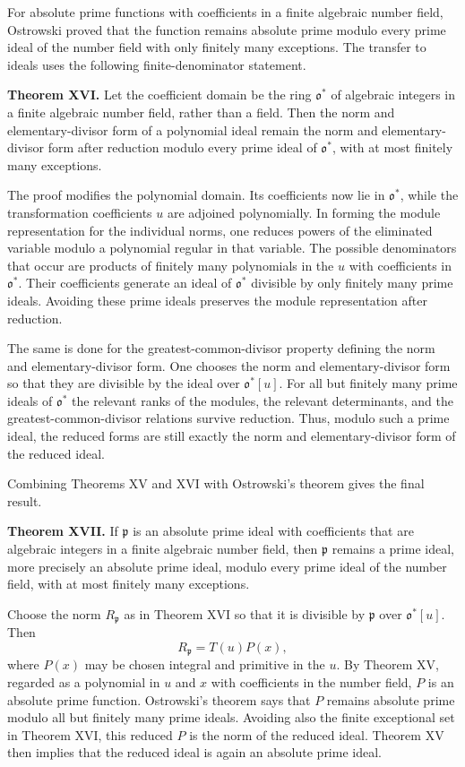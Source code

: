 \documentclass[12pt]{article}
\begin{document}
For absolute prime functions with coefficients in a finite algebraic number field, Ostrowski proved that the function remains absolute prime modulo every prime ideal of the number field with only finitely many exceptions. The transfer to ideals uses the following finite-denominator statement.

\textbf{Theorem XVI.} Let the coefficient domain be the ring $\mathfrak o^*$ of algebraic integers in a finite algebraic number field, rather than a field. Then the norm and elementary-divisor form of a polynomial ideal remain the norm and elementary-divisor form after reduction modulo every prime ideal of $\mathfrak o^*$, with at most finitely many exceptions.

The proof modifies the polynomial domain. Its coefficients now lie in $\mathfrak o^*$, while the transformation coefficients $u$ are adjoined polynomially. In forming the module representation for the individual norms, one reduces powers of the eliminated variable modulo a polynomial regular in that variable. The possible denominators that occur are products of finitely many polynomials in the $u$ with coefficients in $\mathfrak o^*$. Their coefficients generate an ideal of $\mathfrak o^*$ divisible by only finitely many prime ideals. Avoiding these prime ideals preserves the module representation after reduction.

The same is done for the greatest-common-divisor property defining the norm and elementary-divisor form. One chooses the norm and elementary-divisor form so that they are divisible by the ideal over $\mathfrak o^*[u]$. For all but finitely many prime ideals of $\mathfrak o^*$ the relevant ranks of the modules, the relevant determinants, and the greatest-common-divisor relations survive reduction. Thus, modulo such a prime ideal, the reduced forms are still exactly the norm and elementary-divisor form of the reduced ideal.

Combining Theorems XV and XVI with Ostrowski's theorem gives the final result.

\textbf{Theorem XVII.} If $\mathfrak p$ is an absolute prime ideal with coefficients that are algebraic integers in a finite algebraic number field, then $\mathfrak p$ remains a prime ideal, more precisely an absolute prime ideal, modulo every prime ideal of the number field, with at most finitely many exceptions.

Choose the norm $R_{\mathfrak p}$ as in Theorem XVI so that it is divisible by $\mathfrak p$ over $\mathfrak o^*[u]$. Then
\[
  R_{\mathfrak p}=T(u)P(x),
\]
where $P(x)$ may be chosen integral and primitive in the $u$. By Theorem XV, regarded as a polynomial in $u$ and $x$ with coefficients in the number field, $P$ is an absolute prime function. Ostrowski's theorem says that $P$ remains absolute prime modulo all but finitely many prime ideals. Avoiding also the finite exceptional set in Theorem XVI, this reduced $P$ is the norm of the reduced ideal. Theorem XV then implies that the reduced ideal is again an absolute prime ideal.
\end{document}
